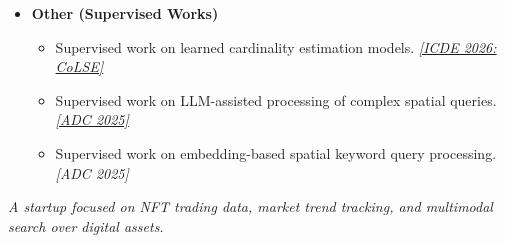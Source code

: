 \documentclass{resume}
\begin{document}
\begin{itemize}[parsep=0.4ex]
\begin{itemize}[parsep=0.3ex]
\item Built learned spatial index structures for multi-dimensional data, enabling efficient spatial query processing with improved lookup performance.
\href{https://people.eng.unimelb.edu.au/baileyj/papers/ICDE2023_ELSI.pdf}{\textit{[ICDE 2023\faExternalLink]}}

\item Developed recursive learned spatial index structures and studied their effectiveness for spatial query workloads.
\href{https://github.com/Liuguanli/RSMI}{\faGithub}
\href{https://www.vldb.org/pvldb/vol13/p2341-qi.pdf}{\textit{[VLDB 2020\faExternalLink]}}
\end{itemize}

\item \textbf{Other (Supervised Works)}
\begin{itemize}[parsep=0.3ex]
    \item Supervised work on learned cardinality estimation models. 
    \href{<paper-link>}{\textit{[ICDE 2026: CoLSE\faExternalLink]}}

   

    \item Supervised work on LLM-assisted processing of complex spatial queries. 
    \href{https://github.com/AI-DB-UoM/complex_spatial_data_generation}{\faGithub}
    \href{https://findanexpert.unimelb.edu.au/scholarlywork/2270718-llm-enhanced-processing-of-complex-spatial-queries?cache=1772143387383}{\textit{[ADC 2025\faExternalLink]}}

     \item Supervised work on embedding-based spatial keyword query processing.{\textit{[ADC 2025]}}
\end{itemize}

\end{itemize}

\textit{A startup focused on NFT trading data, market trend tracking, and multimodal search over digital assets.}
\end{document}
